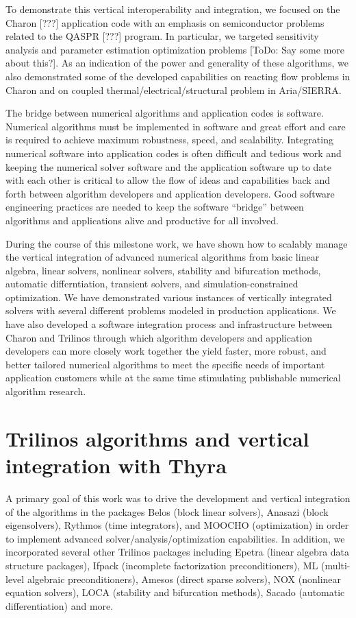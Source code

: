 \documentclass[pdf,ps2pdf,11pt]{SANDreport}
\begin{document}
To demonstrate this vertical interoperability and integration, we focused on
the Charon [???] application code with an emphasis on semiconductor problems
related to the QASPR [???] program.  In particular, we targeted sensitivity
analysis and parameter estimation optimization problems [ToDo: Say some more
about this?].  As an indication of the power and generality of these
algorithms, we also demonstrated some of the developed capabilities on
reacting flow problems in Charon and on coupled thermal/electrical/structural
problem in Aria/SIERRA.

The bridge between numerical algorithms and application codes is software.
Numerical algorithms must be implemented in software and great effort and care
is required to achieve maximum robustness, speed, and scalability.
Integrating numerical software into application codes is often difficult and
tedious work and keeping the numerical solver software and the application
software up to date with each other is critical to allow the flow of ideas and
capabilities back and forth between algorithm developers and application
developers.  Good software engineering practices are needed to keep the
software ``bridge'' between algorithms and applications alive and productive
for all involved.

During the course of this milestone work, we have shown how to scalably manage
the vertical integration of advanced numerical algorithms from basic linear
algebra, linear solvers, nonlinear solvers, stability and bifurcation methods,
automatic differntiation, transient solvers, and simulation-constrained
optimization.  We have demonstrated various instances of vertically integrated
solvers with several different problems modeled in production applications.
We have also developed a software integration process and infrastructure
between Charon and Trilinos through which algorithm developers and application
developers can more closely work together the yield faster, more robust, and
better tailored numerical algorithms to meet the specific needs of important
application customers while at the same time stimulating publishable numerical
algorithm research.

%
\section{Trilinos algorithms and vertical integration with Thyra}
%

A primary goal of this work was to drive the development and vertical
integration of the algorithms in the packages Belos (block linear solvers),
Anasazi (block eigensolvers), Rythmos (time integrators), and MOOCHO
(optimization) in order to implement advanced solver/analysis/optimization
capabilities.  In addition, we incorporated several other Trilinos packages
including Epetra (linear algebra data structure packages), Ifpack (incomplete
factorization preconditioners), ML (multi-level algebraic preconditioners),
Amesos (direct sparse solvers), NOX (nonlinear equation solvers), LOCA
(stability and bifurcation methods), Sacado (automatic differentiation) and
more.
\end{document}
